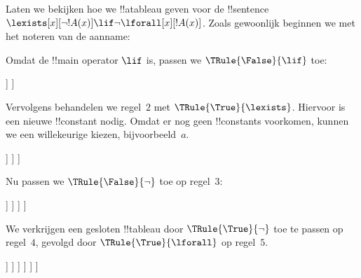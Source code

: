 \documentclass[openany]{memoir}
\begin{document}
\begin{ex}
Laten we bekijken hoe we !!a{tableau} geven voor de !!{sentence}
$\lexists[x][\lnot !A(x)] \lif \lnot \lforall[x][!A(x)]$.
Zoals gewoonlijk beginnen we met het noteren van de aanname:
\begin{oltableau}
[\sFmla{\False}{\lexists[x][\lnot \formula{A}(x)]\lif \lnot
    \lforall[x][\formula{A}(x)]}, just=\TAss]
\end{oltableau}
Omdat de !!{main operator} $\lif$ is, passen we
$\TRule{\False}{\lif}$ toe:
\begin{oltableau}
[\sFmla{\False}{\lexists[x][\lnot \formula{A}(x)]\lif \lnot
    \lforall[x][\formula{A}(x)]}, just=\TAss, checked
  [\sFmla{\True}{\lexists[x][\lnot \formula{A}(x)]},
    just={\TRule{\False}{\lif}[1]}
    [\sFmla{\False}{\lnot\lforall[x][\formula{A}(x)]},
      just={\TRule{\False}{\lif}[1]}]
  ]
]
\end{oltableau}
Vervolgens behandelen we regel~$2$ met
$\TRule{\True}{\lexists}$. Hiervoor is een nieuwe !!{constant} nodig.
Omdat er nog geen !!{constant}s voorkomen, kunnen we een willekeurige
kiezen, bijvoorbeeld~$a$.
\begin{oltableau}
[\sFmla{\False}{\lexists[x][\lnot \formula{A}(x)]\lif \lnot
    \lforall[x][\formula{A}(x)]}, just=\TAss, checked
  [\sFmla{\True}{\lexists[x][\lnot \formula{A}(x)]},
    just={\TRule{\False}{\lif}[1]}, checked
    [\sFmla{\False}{\lnot\lforall[x][\formula{A}(x)]},
      just={\TRule{\False}{\lif}[1]}
      [\sFmla{\True}{\lnot\formula{A}(a)}, just={\TRule{\True}{\lexists}[2]}]
    ]
  ]
]
\end{oltableau}
Nu passen we $\TRule{\False}{\lnot}$ toe op regel~$3$:
\begin{oltableau}
[\sFmla{\False}{\lexists[x][\lnot \formula{A}(x)]\lif \lnot
    \lforall[x][\formula{A}(x)]}, just=\TAss, checked
  [\sFmla{\True}{\lexists[x][\lnot \formula{A}(x)]},
    just={\TRule{\False}{\lif}[1]}, checked
    [\sFmla{\False}{\lnot\lforall[x][\formula{A}(x)]},
      just={\TRule{\False}{\lif}[1]}, checked
      [\sFmla{\True}{\lnot\formula{A}(a)}, just={\TRule{\True}{\lexists}[2]}
        [\sFmla{\True}{\lforall[x][\formula{A}(x)]},
          just = {\TRule{\False}{\lnot}[3]}
        ]
      ]
    ]
  ]
]
\end{oltableau}
We verkrijgen een gesloten !!{tableau} door
$\TRule{\True}{\lnot}$ toe te passen op regel~$4$, gevolgd door
$\TRule{\True}{\lforall}$ op regel~$5$.
\begin{oltableau}
[\sFmla{\False}{\lexists[x][\lnot \formula{A}(x)]\lif \lnot
    \lforall[x][\formula{A}(x)]}, just=\TAss, checked
  [\sFmla{\True}{\lexists[x][\lnot \formula{A}(x)]},
    just={\TRule{\False}{\lif}[1]}, checked
    [\sFmla{\False}{\lnot\lforall[x][\formula{A}(x)]},
      just={\TRule{\False}{\lif}[1]}, checked
      [\sFmla{\True}{\lnot\formula{A}(a)}, just={\TRule{\True}{\lexists}[2]}
        [\sFmla{\True}{\lforall[x][\formula{A}(x)]},
          just = {\TRule{\False}{\lnot}[3]}
          [\sFmla{\False}{\formula{A}(a)}, just={\TRule{\True}{\lnot}[4]}
            [\sFmla{\True}{\formula{A}(a)},
              just={\TRule{\True}{\lforall}[5]}, close
            ]
          ]
        ]
      ]
    ]
  ]
]
\end{oltableau}
\end{ex}
\end{document}
